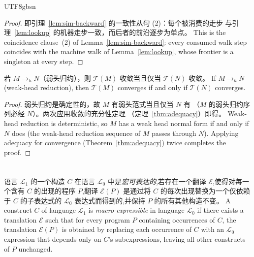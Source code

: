 \begin{CJK*}{UTF8}{gbsn}
\begin{proof}
\ifPaperChinese
  即引理~\ref{lem:sim-backward} 的一致性从句 (2)：每个被消费的走步
  与引理~\ref{lem:lookup} 的机器走步一致，而后者的前沿逐步为单点。
\else
  This is the coincidence clause~(2) of
  Lemma~\ref{lem:sim-backward}: every consumed walk step coincides
  with the machine walk of Lemma~\ref{lem:lookup}, whose frontier is
  a singleton at every step.
\fi
\end{proof}

\begin{theorem}%
  \label{thm:convergence-preservation}
  \ifPaperChinese
  若 $M \to_h N$（弱头归约），则 $\mathcal{T}(M)$ 收敛当且仅当
  $\mathcal{T}(N)$ 收敛。
  \else
  If $M \to_h N$ (weak-head reduction), then
  $\mathcal{T}(M)$ converges if and only if
  $\mathcal{T}(N)$ converges.
  \fi
\end{theorem}

\begin{proof}
  \ifPaperChinese
  弱头归约是确定性的，故 $M$ 有弱头范式当且仅当 $N$ 有
  （$M$ 的弱头归约序列必经 $N$）。两次应用收敛的充分性定理
  （定理~\ref{thm:adequacy}）即得。
  \else
  Weak-head reduction is deterministic, so $M$ has a weak head normal
  form if and only if $N$ does (the weak-head reduction sequence of
  $M$ passes through $N$). Applying adequacy for convergence
  (Theorem~\ref{thm:adequacy}) twice completes the proof.
  \fi
\end{proof}
\section{}
\label{app:expressiveness}

\begin{definition}
  \label{def:macro-expressibility}
  \ifPaperChinese
  语言 $\mathscr{L}_1$ 的一个构造 $C$ 在语言 $\mathscr{L}_0$ 中是\emph{宏可表达的},若存在一个翻译 $\mathcal{E}$,使得对每一个含有 $C$ 的出现的程序 $P$,翻译 $\mathcal{E}(P)$ 是通过将 $C$ 的每次出现替换为一个仅依赖于 $C$ 的子表达式的 $\mathscr{L}_0$ 表达式而得到的,并保持 $P$ 的所有其他构造不变。
  \else
  A construct $C$ of language $\mathscr{L}_1$ is \emph{macro-expressible}
  in language $\mathscr{L}_0$ if there exists a translation $\mathcal{E}$
  such that for every program $P$ containing occurrences of $C$,
  the translation $\mathcal{E}(P)$ is obtained by replacing each
  occurrence of $C$ with an $\mathscr{L}_0$ expression that depends only
  on $C$'s subexpressions, leaving all other constructs of $P$
  unchanged.
  \fi
\end{definition}


\end{CJK*}
